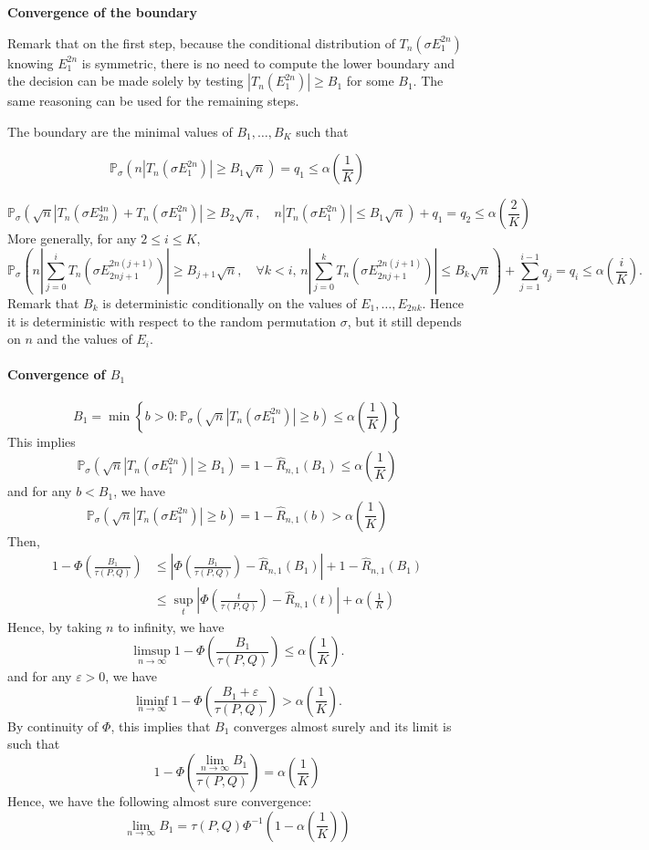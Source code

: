 \documentclass{article}
\theoremstyle{plain}
\theoremstyle{remark}
\renewcommand{\P}{\mathbb{P}}
\newcommand{\1}{\mathbbm{1}}
\numberwithin{equation}{section}
\begin{document}
\textbf{Convergence of the boundary}

Remark that on the first step, because the conditional distribution of $T_n(\sigma E_1^{2n})$ knowing $E_1^{2n}$ is symmetric, there is no need to compute the lower boundary and the decision can be made solely by testing $|T_n(E_1^{2n})|\ge B_1$ for some $B_1$. The same reasoning can be used for the remaining steps.

The boundary are the minimal values of $B_1,\dots, B_K$ such that

$$\P_\sigma(n|T_n(\sigma E_1^{2n})|\ge B_1\sqrt{n}) = q_1 \le \alpha\left(\frac{1}{K}\right) $$

$$\P_\sigma\left( \sqrt{n}|T_n(\sigma E_{2n}^{4n})+T_n(\sigma E_1^{2n})|\ge  B_2\sqrt{n},\quad  n|T_n(\sigma E_1^{2n})|\le  B_1\sqrt{n}  \right)+q_1 = q_2 \le\alpha\left(\frac{2}{K}\right) $$
More generally, for any $2\le i\le K$,
$$ \P_\sigma\left(n\left|\sum_{j=0}^i T_n\left(\sigma E_{2nj+1}^{2n(j+1)}\right)\right|\ge B_{j+1} \sqrt{n}, \quad \forall k < i,\,  n\left|\sum_{j=0}^k T_n\left(\sigma E_{2nj+1}^{2n(j+1)}\right)\right|\le  B_k\sqrt{n}  \right)+\sum_{j=1}^{i-1}q_j  = q_i \le\alpha\left(\frac{i}{K}\right).$$
Remark that $B_k$ is deterministic conditionally on the values of $E_1,\dots,E_{2nk}$. Hence it is deterministic with respect to the random permutation $\sigma$, but it still depends on $n$ and the values of $E_i$.

\paragraph{Convergence of $B_1$}
$$B_1 = \min \left\{ b>0 : \P_\sigma(\sqrt{n}|T_n(\sigma E_1^{2n})|\ge b) \le \alpha\left(\frac{1}{K}\right)\right\} $$
This implies
$$\P_\sigma(\sqrt{n}|T_n(\sigma E_1^{2n})|\ge B_1) = 1-\widehat{R}_{n,1}\left(B_1\right) \le \alpha\left( \frac{1}{K} \right) $$
and for any $b < B_1$, we have
$$\P_\sigma(\sqrt{n}|T_n(\sigma E_1^{2n})|\ge b)=1-\widehat{R}_{n,1}\left(b\right) > \alpha\left( \frac{1}{K} \right) $$
Then,
\begin{align*}
1-\Phi\left( \frac{B_1}{\tau(P,Q)}\right) &\le \left|\Phi\left( \frac{B_1}{\tau(P,Q)}\right) -\widehat{R}_{n,1}\left(B_1\right) \right| + 1 - \widehat{R}_{n,1}\left(B_1\right)\\
&\le \sup_{t}\left|\Phi\left( \frac{t}{\tau(P,Q)}\right) -\widehat{R}_{n,1}\left(t\right) \right| + \alpha\left( \frac{1}{K} \right)
\end{align*}
Hence, by taking $n$ to infinity, we have
$$\limsup_{n \to \infty} 1-\Phi\left( \frac{B_1}{\tau(P,Q)}\right) \le \alpha\left( \frac{1}{K} \right).$$
and for any $\varepsilon>0$, we have
$$\liminf_{n \to \infty} 1-\Phi\left( \frac{B_1+\varepsilon}{\tau(P,Q)}\right) > \alpha\left( \frac{1}{K} \right).$$
By continuity of $\Phi$, this implies that $B_1$ converges almost surely and its limit is such that
$$1-\Phi\left( \frac{\lim_{n \to \infty}B_1}{\tau(P,Q)}\right)= \alpha\left( \frac{1}{K} \right)$$
Hence, we have the following almost sure convergence:
$$\lim_{n \to \infty} B_1 = \tau(P,Q)\Phi^{-1}\left(1- \alpha\left( \frac{1}{K} \right) \right) $$
\newpage
\end{document}
